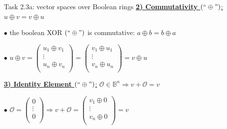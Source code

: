 \documentclass[aspectratio=169]{beamer}
\begin{document}
\begin{frame}{Task 2.3a: vector spaces over Boolean rings}
\underline{\textbf{2) Commutativity $(``\oplus")$}:} $u \oplus v = v \oplus u$\newline

$\bullet$ the boolean XOR $(``\oplus")$ is commutative: $a \oplus b = b \oplus a$\newline

$\bullet$ $u \oplus v =
\begin{pmatrix}
u_1 \oplus v_1\\
\vdots\\
u_n \oplus v_n\\
\end{pmatrix} =
\begin{pmatrix}
v_1 \oplus u_1\\
\vdots\\
v_n \oplus u_n\\
\end{pmatrix} = v \oplus u$\newline

\underline{\textbf{3) Identity Element $(``\oplus")$}:} $\mathcal{O} \in \mathbb{B}^n \Rightarrow v + \mathcal{O} = v$\newline

$\bullet$ $\mathcal{O} =
\begin{pmatrix}
0\\
\vdots\\
0\\
\end{pmatrix} \Rightarrow v + \mathcal{O} =
\begin{pmatrix}
v_1 \oplus 0\\
\vdots\\
v_n \oplus 0\\
\end{pmatrix} = v$\newline
\end{frame}
\end{document}
